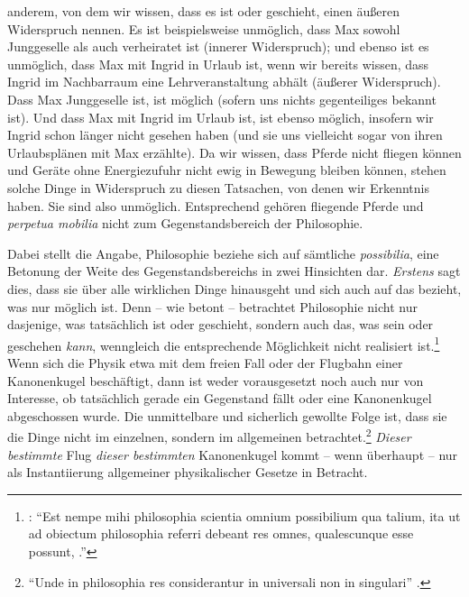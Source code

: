 \begin{nummerierung}
anderem, von dem wir wissen, dass es ist oder geschieht, einen äußeren
Widerspruch nennen. Es ist beispielsweise unmöglich, dass Max sowohl Junggeselle
als auch verheiratet ist (innerer Widerspruch); und ebenso ist es unmöglich,
dass Max mit Ingrid in Urlaub ist, wenn wir bereits wissen, dass Ingrid im
Nachbarraum eine Lehrveranstaltung abhält (äußerer Widerspruch). Dass Max
Junggeselle ist, ist möglich (sofern uns nichts gegenteiliges bekannt ist). Und
dass Max mit Ingrid im Urlaub ist, ist ebenso möglich, insofern wir Ingrid schon
länger nicht gesehen haben (und sie uns vielleicht sogar von ihren Urlaubsplänen
mit Max erzählte). Da wir wissen, dass Pferde nicht fliegen können und Geräte
ohne Energiezufuhr nicht ewig in Bewegung bleiben können, stehen solche Dinge in
Widerspruch zu diesen Tatsachen, von denen wir Erkenntnis haben. Sie sind also
unmöglich. Entsprechend gehören fliegende Pferde und \emph{perpetua mobilia}
nicht zum Gegenstandsbereich der Philosophie.

Dabei stellt die Angabe, Philosophie beziehe sich auf sämtliche
\emph{possibilia}, eine Betonung der Weite des Gegenstandsbereichs in zwei
Hinsichten dar. \emph{Erstens} sagt dies, dass sie über alle wirklichen Dinge
hinausgeht und sich auch auf das bezieht, was nur möglich ist.
Denn -- wie 
betont -- betrachtet Philosophie nicht nur dasjenige, was tatsächlich ist oder
geschieht, sondern auch das, was sein oder geschehen \emph{kann}, wenngleich die
entsprechende Möglichkeit nicht realisiert ist.\footnote{\cite[Vgl.][sectio II,
caput I,
\S~3]{Wolff:RatiopraelectionumWolfianaruminMathesinetPhilosophiamuniversametOpusHugonisGrotiideJurebellietpacis1735}:
\enquote{Est nempe mihi philosophia scientia omnium possibilium qua talium, ita
ut ad obiectum philosophia referri debeant res omnes, qualescunque esse possunt,
.}} Wenn sich die Physik etwa mit dem freien Fall
oder der Flugbahn einer Kanonenkugel beschäftigt, dann ist weder vorausgesetzt noch auch
nur von Interesse, ob tatsächlich gerade ein Gegenstand fällt oder eine
Kanonenkugel abgeschossen wurde. Die unmittelbare und sicherlich gewollte Folge
ist, dass sie die Dinge nicht im einzelnen, sondern im allgemeinen
betrachtet.\footnote{\enquote{Unde in philosophia res considerantur in
universali non in singulari} \parencite[][\S~3,
\pno~107\,f.]{Wolff:RatiopraelectionumWolfianaruminMathesinetPhilosophiamuniversametOpusHugonisGrotiideJurebellietpacis1735}.}
\emph{Dieser bestimmte} Flug \emph{dieser bestimmten} Kanonenkugel kommt -- wenn überhaupt --
nur als Instantiierung allgemeiner physikalischer Gesetze in Betracht.


\end{nummerierung}
